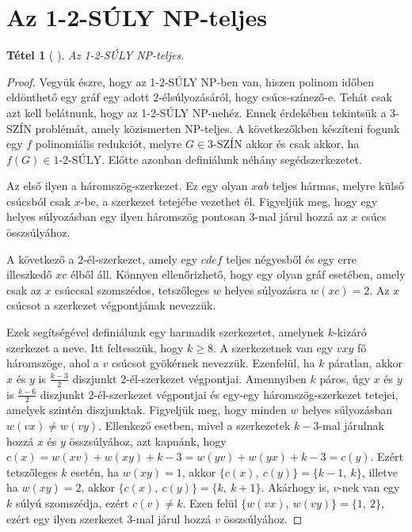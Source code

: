\documentclass[12pt, a4paper]{report}
\newtheorem{tét}{Tétel}[section]
\theoremstyle{remark}
\theoremstyle{definition}
\begin{document}
\section{Az 1-2-SÚLY NP-teljes}
\begin{tét}[\citeauthor{Dudek2011} \cite{Dudek2011}]
Az 1-2-SÚLY NP-teljes.
\end{tét}

\begin{proof}
Vegyük észre, hogy az 1-2-SÚLY NP-ben van, hiszen polinom időben eldönthető egy gráf egy adott $2$-élsúlyozásáról, hogy csúcs-színező-e. Tehát csak azt kell belátnunk, hogy az 1-2-SÚLY NP-nehéz. Ennek érdekében tekintsük a 3-SZÍN problémát, amely közismerten NP-teljes. A következőkben készíteni fogunk egy $f$ polinomiális redukciót, melyre $G \in \textrm{3-SZÍN}$ akkor és csak akkor, ha $f(G) \in \textrm{1-2-SÚLY}$. Előtte azonban definiálunk néhány segédszerkezetet.

Az első ilyen a háromszög-szerkezet. Ez egy olyan $xab$ teljes hármas, melyre külső csúcsból csak $x$-be, a szerkezet tetejébe vezethet él. Figyeljük meg, hogy egy helyes súlyozásban egy ilyen háromszög pontosan $3$-mal járul hozzá az $x$ csúcs összsúlyához. 

A következő a $2$-él-szerkezet, amely egy $cdef$ teljes négyesből és egy erre illeszkedő $xc$ élből áll. Könnyen ellenőrizhető, hogy egy olyan gráf esetében, amely csak az $x$ csúccsal szomszédos, tetszőleges $w$ helyes súlyozásra $w(xc) = 2$. Az $x$ csúcsot a szerkezet végpontjának nevezzük.

Ezek segítségével definiálunk egy harmadik szerkezetet, amelynek $k$-kizáró szerkezet a neve. Itt feltesszük, hogy $k \geq 8$. A szerkezetnek van egy $vxy$ fő háromszöge, ahol a $v$ csúcsot gyökérnek nevezzük. Ezenfelül, ha $k$ páratlan, akkor $x$ és $y$ is $\frac{k - 3}{2}$ diszjunkt $2$-él-szerkezet végpontjai. Amennyiben $k$ páros, úgy $x$ és $y$ is $\frac{k - 6}{2}$ diszjunkt $2$-él-szerkezet végpontjai és egy-egy háromszög-szerkezet tetejei, amelyek szintén diszjunktak. Figyeljük meg, hogy minden $w$ helyes súlyozásban $w(vx) \neq w(vy)$. Ellenkező esetben, mivel a szerkezetek $k - 3$-mal járulnak hozzá $x$ és $y$ összsúlyához, azt kapnánk, hogy $c(x) = w(xv) + w(xy) + k - 3 = w(yv) + w(yx) + k - 3 = c(y)$. Ezért tetszőleges $k$ esetén, ha $w(xy) = 1$, akkor $\lbrace c(x),\ c(y) \rbrace = \lbrace k - 1,\ k \rbrace$, illetve ha $w(xy) = 2$, akkor $\lbrace c(x),\ c(y) \rbrace = \lbrace k,\ k + 1 \rbrace$. Akárhogy is, $v$-nek van egy $k$ súlyú szomszédja, ezért $c(v) \neq k$. Ezen felül $\lbrace w(vx),\ w(vy) \rbrace = \lbrace 1,\ 2 \rbrace$, ezért egy ilyen szerkezet $3$-mal járul hozzá $v$ összsúlyához.
 

\end{proof}
\end{document}
